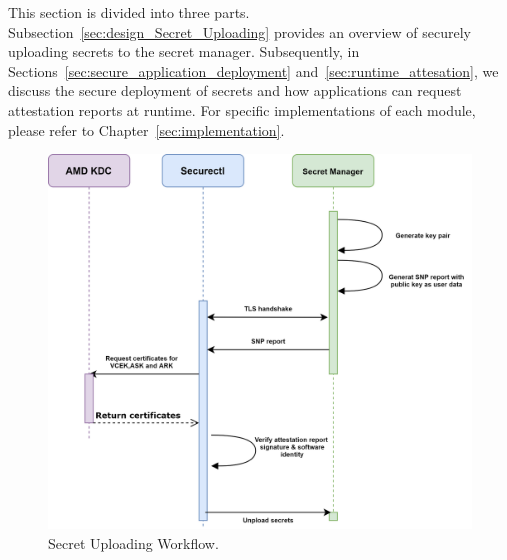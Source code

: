 This section is divided into three parts. Subsection~\ref{sec:design_Secret_Uploading} provides an overview of securely uploading secrets to the secret manager. Subsequently, in Sections~\ref{sec:secure_application_deployment} and~\ref{sec:runtime_attesation}, we discuss the secure deployment of secrets and how applications can request attestation reports at runtime. For specific implementations of each module, 
please refer to Chapter~\ref{sec:implementation}.
\begin{figure}[!htb]
    \centering
    \includegraphics[height=0.4\textheight]{images/upload_secret.png}
    \caption[Secret Uploading Workflow]{Secret Uploading Workflow.}
    \label{fig:upload_secret}
\end{figure}

